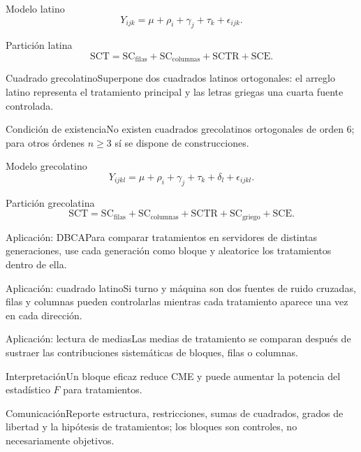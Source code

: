 \documentclass[10pt,aspectratio=169]{beamer}
\begin{document}
\begin{frame}{Modelo latino}\small\[Y_{ijk}=\mu+\rho_i+\gamma_j+\tau_k+\epsilon_{ijk}.\]\end{frame}
\begin{frame}{Partición latina}\small\[\mathrm{SCT}=\mathrm{SC}_{\mathrm{filas}}+\mathrm{SC}_{\mathrm{columnas}}+\mathrm{SCTR}+\mathrm{SCE}.\]\end{frame}
\begin{frame}{Cuadrado grecolatino}\small Superpone dos cuadrados latinos ortogonales: el arreglo latino representa el tratamiento principal y las letras griegas una cuarta fuente controlada.\end{frame}
\begin{frame}{Condición de existencia}\small No existen cuadrados grecolatinos ortogonales de orden $6$; para otros órdenes $n\geq3$ sí se dispone de construcciones.\end{frame}
\begin{frame}{Modelo grecolatino}\small\[Y_{ijkl}=\mu+\rho_i+\gamma_j+\tau_k+\delta_l+\epsilon_{ijkl}.\]\end{frame}
\begin{frame}{Partición grecolatina}\small\[\mathrm{SCT}=\mathrm{SC}_{\mathrm{filas}}+\mathrm{SC}_{\mathrm{columnas}}+\mathrm{SCTR}+\mathrm{SC}_{\mathrm{griego}}+\mathrm{SCE}.\]\end{frame}
\begin{frame}{Aplicación: DBCA}\small Para comparar tratamientos en servidores de distintas generaciones, use cada generación como bloque y aleatorice los tratamientos dentro de ella.\end{frame}
\begin{frame}{Aplicación: cuadrado latino}\small Si turno y máquina son dos fuentes de ruido cruzadas, filas y columnas pueden controlarlas mientras cada tratamiento aparece una vez en cada dirección.\end{frame}
\begin{frame}{Aplicación: lectura de medias}\small Las medias de tratamiento se comparan después de sustraer las contribuciones sistemáticas de bloques, filas o columnas.\end{frame}
\begin{frame}{Interpretación}\small Un bloque eficaz reduce CME y puede aumentar la potencia del estadístico $F$ para tratamientos.\end{frame}
\begin{frame}{Comunicación}\small Reporte estructura, restricciones, sumas de cuadrados, grados de libertad y la hipótesis de tratamientos; los bloques son controles, no necesariamente objetivos.\end{frame}
\end{document}
